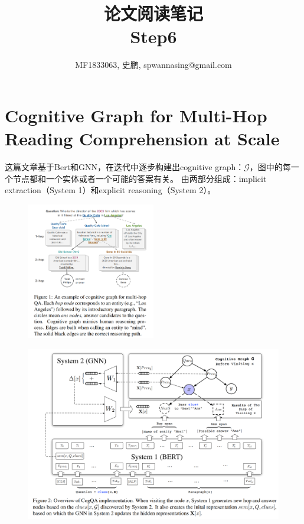 \documentclass[a4paper,UTF8]{article}
\numberwithin{equation}{section}
\begin{document}
\title{论文阅读笔记\\
Step6}
\author{MF1833063, 史鹏, spwannasing@gmail.com}
\maketitle


\newpage
\section{Cognitive Graph for Multi-Hop Reading Comprehension at Scale}
这篇文章基于Bert和GNN，在迭代中逐步构建出cognitive graph：$\mathcal{G}$，图中的每一个节点都和一个实体或者一个可能的答案有关。
由两部分组成：implicit extraction（System 1）和explicit reasoning（System 2）。

\begin{figure}[H]
	\centering
	\includegraphics[width=0.5\textwidth]{1-1.png}
\end{figure}
\begin{figure}[H]
	\centering
	\includegraphics[width=\textwidth]{1-3.png}
\end{figure}
\end{document}
